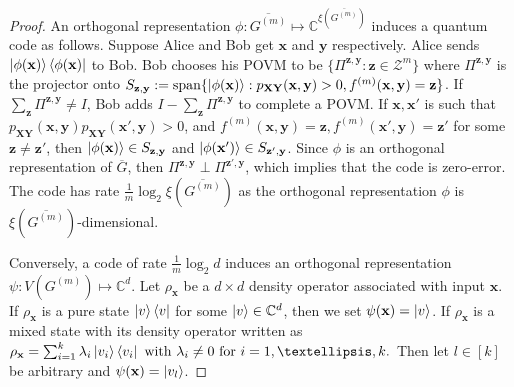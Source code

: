 \documentclass[10pt,a4paper]{amsart}
\newcommand{\aditya}[1]{\marginpar{+}{\bf Aditya's remark}: {\em #1}}
\newcommand{\bbC}{\mathbb{C}}
\newcommand{\bfX}{\mathbf{X}}
\newcommand{\bfY}{\mathbf{Y}}
\newcommand{\bfx}{\mathbf{x}}
\newcommand{\bfy}{\mathbf{y}}
\newcommand{\bfz}{\mathbf{z}}
\newcommand{\calZ}{\mathcal{Z}}
\newcommand{\meng}[1]{\marginpar{+}{\bf Ruoyu's remark}: {\em #1}}
\begin{document}
\begin{proof}
An orthogonal representation $\phi:\overline{G^{(m)}}\mapsto \bbC^{\xi(\overline{G^{(m)}})}$  induces a quantum code as follows. Suppose Alice and Bob get  $\bfx $ and $\bfy$ respectively.  Alice sends $\ket{\phi(\bfx)}\bra{\phi(\bfx)}$ to Bob.  Bob chooses his POVM to be $\{\Pi^{\bfz,\bfy}  :\bfz\in \calZ^m\}$ where $\Pi^{\bfz,\bfy}$ is the projector onto $S_{\bfz,\bfy}:=\text{span}\{\ket{\phi(\bfx)}:p_{\bfX\bfY}(\bfx,\bfy)>0, f^{(m)}(\bfx,\bfy) 
 = \bfz \}$. 
 If $\sum_{\bfz}\Pi^{\bfz,\bfy}\ne I$, Bob adds $I-\sum_{\bfz}\Pi^{\bfz,\bfy}$ to complete a POVM. If $\bfx,\bfx'$ is such that $p_{\bfX\bfY}(\bfx,\bfy)p_{\bfX\bfY}(\bfx',\bfy)>0$, and $f^{(m)}(\bfx,\bfy)=\bfz,f^{(m)}(\bfx',\bfy)=\bfz'$ for some $\bfz\ne \bfz'$, then $\ket{\phi(\bfx)} \in S_{\bfz,\bfy}$ and $\ket{\phi(\bfx')}\in S_{\bfz',\bfy}$. Since $\phi$ is an orthogonal representation of $\overline{G}$, then  $\Pi^{\bfz,\bfy}\perp\Pi^{\bfz',\bfy}$, which implies that  the code is zero-error.   The code has rate $\frac{1}{m}\log_2\xi(\overline{G^{(m)}})$ as the orthogonal representation $\phi$ is $\xi(\overline{G^{(m)}})$-dimensional.


Conversely, a code   of rate $\frac{1}{m}\log_2d$ induces an orthogonal representation $\psi:V(G^{(m)})\mapsto \bbC^{d}$. Let $\rho_{\bfx}$ be a $d\times d$  density operator associated with input $\bfx$. If $\rho_{\bfx}$ is a pure state $\ket{v}\bra{v}$ for some $\ket{v}\in \bbC^d$, then we set  
 $\psi(\bfx) = \ket{v}$. If $\rho_{\bfx}$ is a mixed state with its density operator written as  
 $\rho_{\bfx} =\sum_{i=1}^k \lambda_i\ket{v_i}\bra{v_i}\text{ with }\lambda_i\ne 0\text{ for }i=1,\dots,k.$
Then let $l\in[k]$ be arbitrary and $\psi(\bfx ) = \ket{v_l}$. 




\end{proof}
\end{document}
